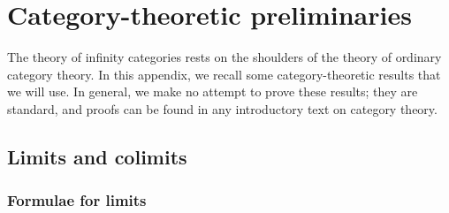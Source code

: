\documentclass[main.tex]{subfiles}
\begin{document}
\chapter{Category-theoretic preliminaries}
\label{ch:category_theoretic_preliminaries}

The theory of infinity categories rests on the shoulders of the theory of ordinary category theory. In this appendix, we recall some category-theoretic results that we will use. In general, we make no attempt to prove these results; they are standard, and proofs can be found in any introductory text on category theory. 

\section{Limits and colimits}
\label{sec:limits_and_colimits}

\subsection{Formulae for limits}
\label{ssc:formulae_for_limits}
\end{document}
